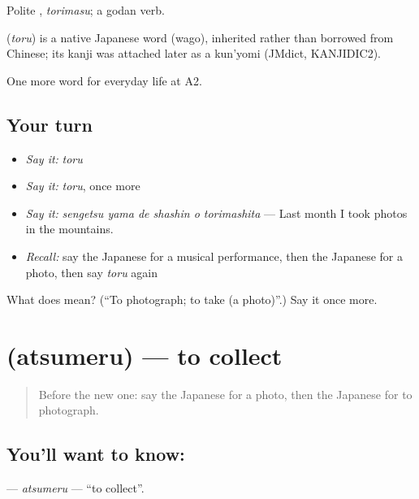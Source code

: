 Polite \textbf{}, \emph{torimasu}; a godan verb.

\begin{cousinweb}
\textbf{} (\emph{toru}) is a native Japanese word (wago), inherited rather than borrowed from Chinese; its kanji was attached later as a kun'yomi (JMdict, KANJIDIC2).
\end{cousinweb}

\begin{grammarlens}[title={What you've built}]
One more word for everyday life at A2.
\end{grammarlens}

\subsection*{Your turn}
\begin{itemize}
\raggedright
  \item \emph{Say it:} \emph{toru}
  \item \emph{Say it:} \emph{toru}, once more
  \item \emph{Say it:} \emph{sengetsu yama de shashin o torimashita} — Last month I took photos in the mountains.
  \item \emph{Recall:} say the Japanese for a musical performance, then the Japanese for a photo, then say \emph{toru} again
\end{itemize}

\begin{tcolorbox}[breakable,colback=teal!4,colframe=teal!35!black,title={Before you move on}]
What does  mean? (\textquotedblleft{}To photograph; to take (a photo)\textquotedblright{}.) Say it once more.
\end{tcolorbox}
\section[\texorpdfstring{\ja{あつめる} (atsumeru)}{あつめる (atsumeru)}]{ (atsumeru) — to collect}

\label{lesson:JA-C237-atsumeru}



\begin{quote}
Before the new one: say the Japanese for a photo, then the Japanese for to photograph.
\end{quote}

\subsection*{You'll want to know: }
\textbf{} — \emph{atsumeru} — \textquotedblleft{}to collect\textquotedblright{}.

